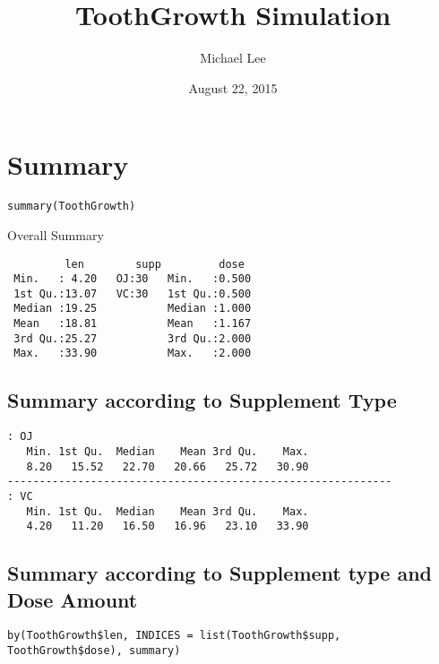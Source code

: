 \documentclass[11pt]{article} %
\title{ToothGrowth Simulation}
\author{Michael Lee}
\date{August 22, 2015} %
\begin{document}
\maketitle

\section{Summary}

\begin{lstlisting}
summary(ToothGrowth)
\end{lstlisting}

Overall Summary 

\begin{lstlisting}
		 len        supp         dose      
 Min.   : 4.20   OJ:30   Min.   :0.500  
 1st Qu.:13.07   VC:30   1st Qu.:0.500  
 Median :19.25           Median :1.000  
 Mean   :18.81           Mean   :1.167  
 3rd Qu.:25.27           3rd Qu.:2.000  
 Max.   :33.90           Max.   :2.000  
\end{lstlisting}

\subsection{Summary according to Supplement Type}

\begin{lstlisting}
: OJ
   Min. 1st Qu.  Median    Mean 3rd Qu.    Max. 
   8.20   15.52   22.70   20.66   25.72   30.90 
------------------------------------------------------------ 
: VC
   Min. 1st Qu.  Median    Mean 3rd Qu.    Max. 
   4.20   11.20   16.50   16.96   23.10   33.90 
\end{lstlisting}

\subsection{Summary according to Supplement type and Dose Amount}

\begin{lstlisting}
by(ToothGrowth$len, INDICES = list(ToothGrowth$supp, ToothGrowth$dose), summary)
\end{lstlisting}
\end{document}
